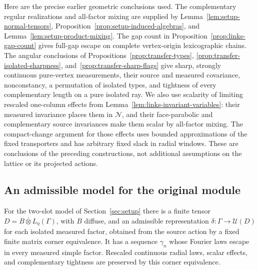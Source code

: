 Here are the precise earlier geometric conclusions used.  The
complementary regular realizations and all-factor mixing are supplied
by Lemma~\ref{lem:setup-normal-tensors},
Proposition~\ref{prop:setup-induced-algebras}, and
Lemma~\ref{lem:setup-product-mixing}. The gap count in
Proposition~\ref{prop:links-gap-count}
gives full-gap escape on complete vertex-origin lexicographic chains.
The angular conclusions of Propositions~\ref{prop:transfer-types},
\ref{prop:transfer-isolated-sharpness}, and~\ref{prop:transfer-sharp-flags}
give sharp, strongly continuous
pure-vertex measurements, their source and measured covariance,
nonconstancy, a permutation of isolated types, and tightness of every
complementary length on a pure isolated ray. We also use scalarity of
limiting rescaled one-column effects from
Lemma~\ref{lem:links-invariant-variables}: their measured invariance places
them in $\mathcal N$, and their face-parabolic and complementary source
invariances make them scalar by all-factor mixing.  The compact-change
argument for those effects uses bounded approximations of the fixed
transporters and has arbitrary fixed slack in radial windows.  These
are conclusions of the preceding constructions, not additional
assumptions on the lattice or its projected actions.

\subsection{An admissible model for the original module}

\begin{lemma}\label{lem:scale-original-model}
For the two-slot model of Section~\ref{sec:setup} there is a
finite tensor \(D=B\bar\otimes L_\eta(\Gamma)\), with \(B\)
diffuse, and an admissible representation
\(\delta:\Gamma\to\mathcal U(D)\) for each isolated measured
factor, obtained from the source action by a fixed finite
matrix corner equivalence.  It has a sequence \(\gamma_n\)
whose Fourier laws escape in every measured simple factor.
Rescaled continuous radial laws, scalar effects, and
complementary tightness are preserved by this corner equivalence.
\end{lemma}

